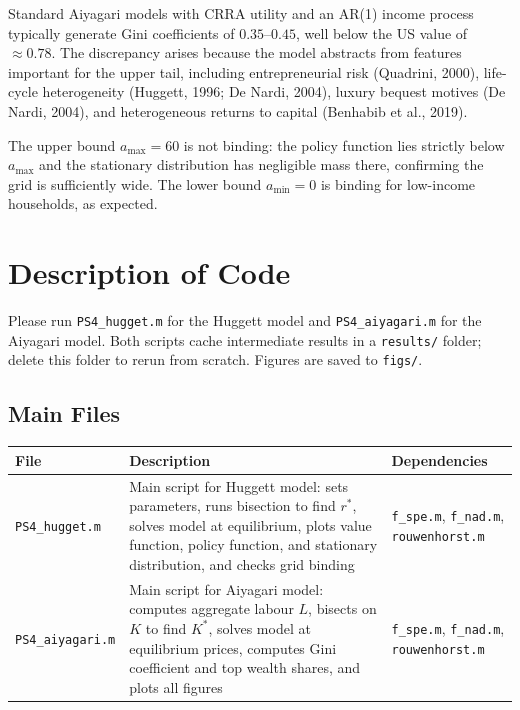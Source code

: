 \documentclass{article}
\begin{document}
Standard Aiyagari models with CRRA utility and an AR(1) income process typically
generate Gini coefficients of $0.35$--$0.45$, well below the US value of $\approx 0.78$.
The discrepancy arises because the model abstracts from features important for the upper
tail, including entrepreneurial risk (Quadrini, 2000), life-cycle heterogeneity
(Huggett, 1996; De Nardi, 2004), luxury bequest motives (De Nardi, 2004), and
heterogeneous returns to capital (Benhabib et al., 2019).

The upper bound $a_{\max} = 60$ is not binding: the policy function lies strictly
below $a_{\max}$ and the stationary distribution has negligible mass there,
confirming the grid is sufficiently wide. The lower bound $a_{\min} = 0$ is binding
for low-income households, as expected.

\section{Description of Code}

Please run \texttt{PS4\_hugget.m} for the Huggett model and \texttt{PS4\_aiyagari.m}
for the Aiyagari model. Both scripts cache intermediate results in a \texttt{results/}
folder; delete this folder to rerun from scratch. Figures are saved to \texttt{figs/}.

\subsection{Main Files}

\vspace{0.5cm}
\begin{tabularx}{\linewidth}{|X|X|X|}
    \hline
    \textbf{File} & \textbf{Description} & \textbf{Dependencies} \\
    \hline
    \texttt{PS4\_hugget.m} &
        Main script for Huggett model: sets parameters, runs bisection to find $r^*$,
        solves model at equilibrium, plots value function, policy function, and
        stationary distribution, and checks grid binding &
        \texttt{f\_spe.m}, \texttt{f\_nad.m}, \texttt{rouwenhorst.m} \\
    \hline
    \texttt{PS4\_aiyagari.m} &
        Main script for Aiyagari model: computes aggregate labour $L$, bisects on $K$
        to find $K^*$, solves model at equilibrium prices, computes Gini coefficient
        and top wealth shares, and plots all figures &
        \texttt{f\_spe.m}, \texttt{f\_nad.m}, \texttt{rouwenhorst.m} \\
    \hline
\end{tabularx}
\end{document}
